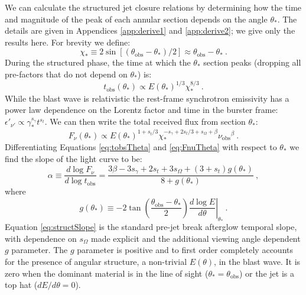 \documentclass[twocolumn]{aastex62}
\newcommand{\tobs}{\ensuremath{t_{\mathrm{obs}}}}
\newcommand{\nuobs}{\ensuremath{\nu_{\mathrm{obs}}}}
\newcommand{\thobs}{\ensuremath{\theta_{\mathrm{obs}}}}
\newcommand{\som}{\ensuremath{s_{\Omega}}}
\begin{document}
We can calculate the structured jet closure relations by determining how the time and magnitude of the peak of each annular section depends on the angle $\theta_*$.  The details are given in Appendices \ref{app:derive1} and \ref{app:derive2}; we give only the results here.  For brevity we define:
\begin{equation}
	\chi_* \equiv 2 \sin\left[\left(\thobs - \theta_*\right)/2\right] \approx \thobs-\theta_* \ . \label{eq:chiDef}
\end{equation} 
During the structured phase, the time at which the $\theta_*$ section peaks (dropping all pre-factors that do not depend on $\theta_*$) is:
\begin{equation}
	\tobs(\theta_*) \propto E(\theta_*)^{1/3} \chi_*^{8/3}\ . \label{eq:tobsTheta}
\end{equation}
While the blast wave is relativistic the rest-frame synchrotron emissivity has a power law dependence on the Lorentz factor and time in the burster frame: $\epsilon'_{\nu'} \propto \gamma_*^{s_\gamma} t^{s_t}$.  We can then write the total received flux from section $\theta_*$:
\begin{equation}
	F_\nu(\theta_*) \propto E(\theta_*)^{1 + s_t/3} \chi_*^{-s_\gamma + 2s_t/3 + \som + \beta} \nuobs^\beta\ .\label{eq:FnuTheta}
\end{equation}
Differentiating Equations \eqref{eq:tobsTheta} and \eqref{eq:FnuTheta} with respect to $\theta_*$ we find the slope of the light curve to be:
\begin{equation}
	\alpha \equiv \frac{d \log F_\nu}{d \log \tobs} = \frac{3 \beta - 3s_\gamma + 2s_t + 3\som + (3+s_t) g(\theta_*)}{8+g(\theta_*)}\ , \label{eq:structSlope}
\end{equation}
where
\begin{equation}
	g(\theta_*) \equiv -2\tan\left(\frac{\thobs-\theta_*}{2}\right) \left . \frac{d \log E}{d \theta}\right |_{\theta_*} \ . \label{eq:gdef}
\end{equation}
Equation \eqref{eq:structSlope} is the standard pre-jet break afterglow temporal slope, with dependence on $\som$ made explicit and the additional viewing angle dependent $g$ parameter.  The $g$ parameter is positive and to first order completely accounts for the presence of angular structure, a non-trivial $E(\theta)$, in the blast wave.  It is zero when the dominant material is in the line of sight ($\theta_* = \thobs$) or the jet is a top hat ($dE/d\theta = 0$).
\end{document}
